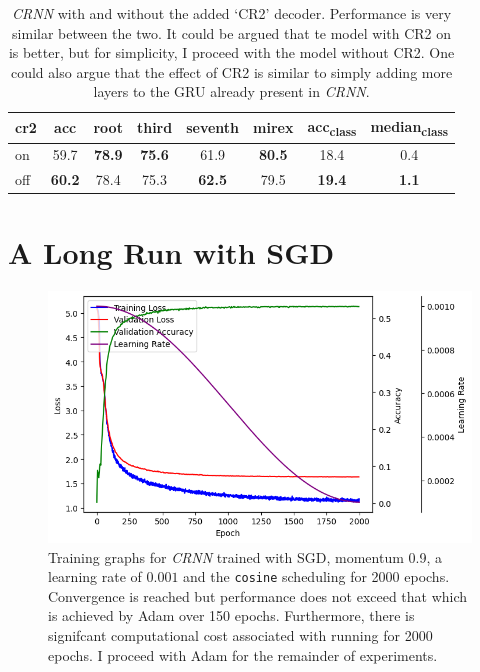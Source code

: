 \begin{table}[H]
    \centering
    \begin{tabular}{lccccccc}
        \toprule
        cr2 & acc & root & third & seventh & mirex & acc\textsubscript{class} & median\textsubscript{class} \\  
        \midrule
        on & 59.7 & \textbf{78.9} & \textbf{75.6} & 61.9 & \textbf{80.5} & 18.4 & 0.4 \\
        off & \textbf{60.2} & 78.4 & 75.3 & \textbf{62.5} & 79.5 & \textbf{19.4} & \textbf{1.1} \\
        \bottomrule
    \end{tabular}
    \caption{\emph{CRNN} with and without the added `CR2' decoder. Performance is very similar between the two. It could be argued that te model with CR2 on is better, but for simplicity, I proceed with the model without CR2. One could also argue that the effect of CR2 is similar to simply adding more layers to the GRU already present in \emph{CRNN}.}
\end{table}

\section{A Long Run with SGD}\label{app:long_sgd}
\begin{figure}[H]
    \centering
    \includegraphics[width=1.0\textwidth]{figures/long_sgd_training_plot.png}
    \caption{Training graphs for \emph{CRNN} trained with SGD, momentum 0.9, a learning rate of $0.001$ and the \texttt{cosine} scheduling for 2000 epochs. Convergence is reached but performance does not exceed that which is achieved by Adam over 150 epochs. Furthermore, there is signifcant computational cost associated with running for 2000 epochs. I proceed with Adam for the remainder of experiments. }\label{fig:long_sgd}
\end{figure}


